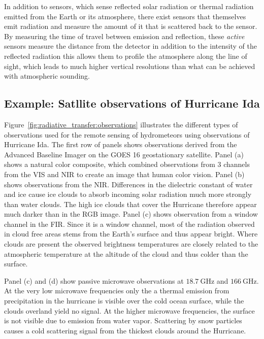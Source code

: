 In addition to  sensors, which sense reflected solar radiation or
thermal radiation emitted from the Earth or its atmosphere, there exist sensors
that themselves emit radiation and measure the amount of it that is scattered
back to the sensor. By measuring the time of travel between emission and
reflection, these \textit{active} sensors measure the distance from the detector
in addition to the intensity of the reflected radiation this allows them to
profile the atmosphere along the line of sight, which leads to much higher
vertical resolutions than what can be achieved with atmospheric sounding.

\subsection{Example: Satllite observations of Hurricane Ida}

Figure~\ref{fig:radiative_transfer:observations} illustrates the different types
of observations used for the remote sensing of hydrometeors using observations
of Hurricane Ida. The first row of panels shows observations derived from the
Advanced Baseline Imager on the GOES 16 geostationary satellite. Panel (a) shows
a natural color composite, which combined observations from 3 channels from the
VIS and NIR to create an image that human color vision. Panel (b) shows
observations from the NIR. Differences in the dielectric constant of water and
ice cause ice clouds to absorb incoming solar radiation much more strongly than
water clouds. The high ice clouds that cover the Hurricane therefore appear much
darker than in the RGB image. Panel (c) shows observation from a window channel
in the FIR. Since it is a window channel, most of the radiation observed in
cloud free areas stems from the Earth's surface and thus appear bright. Where
clouds are present the observed brightness temperatures are closely related to
the atmospheric temperature at the altitude of the cloud and thus colder than
the surface.

Panel (c) and (d) show passive microwave observations at $\SI{18.7}{\giga
  \hertz}$ and $\SI{166}{\giga \hertz}$. At the very low microwave frequencies
only the a thermal emission from precipitation in the hurricane is visible over
the cold ocean surface, while the clouds overland yield no signal. At the higher
microwave frequencies, the surface is not visible due to emission from water
vapor. Scattering by snow particles causes a cold scattering signal from the
thickest clouds around the Hurricane.

